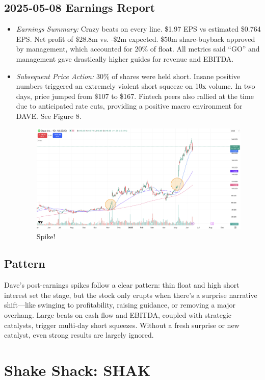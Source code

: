 \documentclass[11pt]{article}
\begin{document}
    \subsection{2025-05-08 Earnings Report}
        \begin{itemize}
            \item \textit{Earnings Summary:} Crazy beats on every line. \$1.97 EPS vs estimated \$0.764 EPS. Net profit of \$28.8m vs. -\$2m expected. \$50m share-buyback approved by management, which accounted for 20\% of float. All metrics said ``GO'' and management gave drastically higher guides for revenue and EBITDA.
            \item \textit{Subsequent Price Action:} 30\% of shares were held short. Insane positive numbers triggered an extremely violent short squeeze on 10x volume. In two days, price jumped from \$107 to \$167. Fintech peers also rallied at the time due to anticipated rate cuts, providing a positive macro environment for DAVE. See Figure 8.
            \begin{figure}[h]
                \centering \includegraphics[width=0.8\linewidth]{images/DAVE2.png}
                \caption{Spike!}
            \end{figure}
        \end{itemize}
    \subsection{Pattern}
        Dave’s post-earnings spikes follow a clear pattern: thin float and high short interest set the stage, but the stock only erupts when there's a surprise narrative shift—like swinging to profitability, raising guidance, or removing a major overhang. Large beats on cash flow and EBITDA, coupled with strategic catalysts, trigger multi-day short squeezes. Without a fresh surprise or new catalyst, even strong results are largely ignored.
\section{Shake Shack: SHAK}
\end{document}
